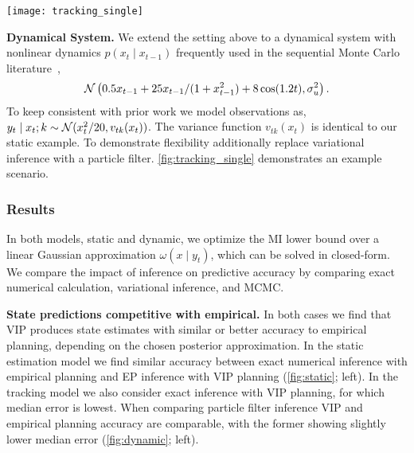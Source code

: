 \begin{figure*}[!t]
  \centering
  \hspace{-3mm}
  \texttt{[image: tracking\_single]}
  \vspace{-3mm}
  \caption{\small\textbf{Nonlinear tracking example} in a field of
    $K=10$ equally spaced, stationary, sensors.  The most informative
    comparison is to the optimal result, exact MI planning based on
    the exact posterior, computed by numerical approximation.  We have
    also included an \emph{oracle} which selects the sensor closest to
    the true target location, for reference.  In typical cases such as
    this one, we see that VIP state error is comparable to empirical
    estimation under the same posterior approximation.  However, VIP
    shows lower accuracy when planning is computed against an
    approximate posterior, in this case particle filtering (PF).}
  \label{fig:tracking_single}
\end{figure*}

\textbf{Dynamical System.} We extend the setting above to a dynamical
system with nonlinear dynamics $p(x_t\mid x_{t-1})$ frequently used in
the sequential Monte Carlo literature~\citep{kitagawa1996monte,
  gordon1993novel, cappe2007overview},
\[
  \mathcal{N}\left(0.5 x_{t-1} + 25 x_{t-1} / (1+x_{t-1}^2)
  + 8 \cos(1.2t), \sigma_u^2\right).
\]
To keep consistent with prior work we model observations
as, \mbox{$y_t \mid x_t; k \sim \mathcal{N}(x_t^2/20, v_{tk}(x_t))$}.  The
variance function $v_{tk}(x_t)$ is identical to our static example.
To demonstrate flexibility additionally replace variational inference
with a particle filter.  \FIG\ref{fig:tracking_single} demonstrates an
example scenario.

\subsubsection{Results}
In both models, static and dynamic, we optimize the MI lower bound
over a linear Gaussian approximation $\omega(x \mid y_t)$, which can
be solved in closed-form.  We compare the impact of inference on
predictive accuracy by comparing exact numerical calculation,
variational inference, and MCMC.

\textbf{State predictions competitive with empirical.}  In both cases
we find that VIP produces state estimates with similar or better
accuracy to empirical planning, depending on the chosen posterior
approximation.  In the static estimation model we find similar
accuracy between exact numerical inference with empirical planning and
EP inference with VIP planning (\FIG\ref{fig:static}; left).  In the
tracking model we also consider exact inference with VIP planning, for
which median error is lowest.  When comparing particle filter
inference VIP and empirical planning accuracy are comparable, with the
former showing slightly lower median error (\FIG\ref{fig:dynamic};
left).


